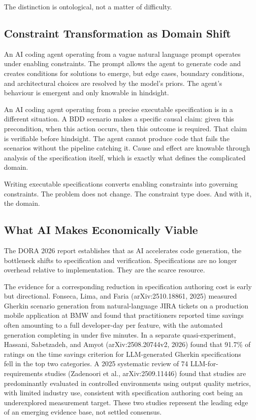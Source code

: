 \documentclass{article}
\begin{document}
The distinction is ontological, not a matter of difficulty.

\subsection{Constraint Transformation as Domain Shift}

An AI coding agent operating from a vague natural language prompt operates
under enabling constraints. The prompt allows the agent to generate code
and creates conditions for solutions to emerge, but edge cases, boundary
conditions, and architectural choices are resolved by the model's priors.
The agent's behaviour is emergent and only knowable in hindsight.

An AI coding agent operating from a precise executable specification is
in a different situation. A BDD scenario makes a specific causal claim:
given this precondition, when this action occurs, then this outcome is
required. That claim is verifiable before hindsight. The agent cannot
produce code that fails the scenarios without the pipeline catching it.
Cause and effect are knowable through analysis of the specification
itself, which is exactly what defines the complicated domain.

Writing executable specifications converts enabling constraints into
governing constraints. The problem does not change. The constraint type
does. And with it, the domain.

\subsection{What AI Makes Economically Viable}

The DORA 2026 report establishes that as AI accelerates code generation,
the bottleneck shifts to specification and verification. Specifications
are no longer overhead relative to implementation. They are the scarce
resource.

The evidence for a corresponding reduction in specification authoring
cost is early but directional. Fonseca, Lima, and Faria
(arXiv:2510.18861, 2025) measured Gherkin scenario generation from
natural-language JIRA tickets on a production mobile application at BMW
and found that practitioners reported time savings often amounting to a
full developer-day per feature, with the automated generation completing
in under five minutes. In a separate quasi-experiment, Hassani,
Sabetzadeh, and Amyot (arXiv:2508.20744v2, 2026) found that 91.7\% of
ratings on the time savings criterion for LLM-generated Gherkin
specifications fell in the top two categories. A 2025 systematic review
of 74 LLM-for-requirements studies (Zadenoori et al.,
arXiv:2509.11446) found that studies are predominantly evaluated in
controlled environments using output quality metrics, with limited
industry use, consistent with specification authoring cost being an
underexplored measurement target. These two studies represent the
leading edge of an emerging evidence base, not settled consensus.
\end{document}
